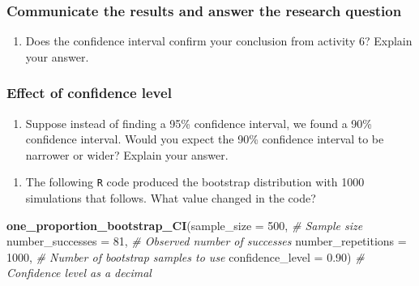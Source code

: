 \documentclass[
]{report}
\newenvironment{Shaded}{\begin{snugshade}}{\end{snugshade}}
\newcommand{\CommentTok}[1]{\textcolor[rgb]{0.56,0.35,0.01}{\textit{#1}}}
\newcommand{\DataTypeTok}[1]{\textcolor[rgb]{0.13,0.29,0.53}{#1}}
\newcommand{\DecValTok}[1]{\textcolor[rgb]{0.00,0.00,0.81}{#1}}
\newcommand{\FloatTok}[1]{\textcolor[rgb]{0.00,0.00,0.81}{#1}}
\newcommand{\KeywordTok}[1]{\textcolor[rgb]{0.13,0.29,0.53}{\textbf{#1}}}
\newcommand{\NormalTok}[1]{#1}
\providecommand{\tightlist}{%
  \setlength{\itemsep}{0pt}\setlength{\parskip}{0pt}}
\begin{document}
\vspace{.8in}

\hypertarget{communicate-the-results-and-answer-the-research-question-1}{%
\subsubsection*{Communicate the results and answer the research question}\label{communicate-the-results-and-answer-the-research-question-1}}

\begin{enumerate}
\def\labelenumi{\arabic{enumi}.}
\setcounter{enumi}{11}
\tightlist
\item
  Does the confidence interval confirm your conclusion from activity 6? Explain your answer.
\end{enumerate}

\vspace{1in}

\newpage

\hypertarget{effect-of-confidence-level}{%
\subsubsection{Effect of confidence level}\label{effect-of-confidence-level}}

\begin{enumerate}
\def\labelenumi{\arabic{enumi}.}
\setcounter{enumi}{12}
\tightlist
\item
  Suppose instead of finding a 95\% confidence interval, we found a 90\% confidence interval. Would you expect the 90\% confidence interval to be narrower or wider? Explain your answer.
\end{enumerate}

\vspace{0.5in}

\begin{enumerate}
\def\labelenumi{\arabic{enumi}.}
\setcounter{enumi}{13}
\tightlist
\item
  The following \texttt{R} code produced the bootstrap distribution with 1000 simulations that follows. What value changed in the code?
\end{enumerate}

\begin{Shaded}
\begin{Highlighting}[]
\KeywordTok{one\_proportion\_bootstrap\_CI}\NormalTok{(}\DataTypeTok{sample\_size =} \DecValTok{500}\NormalTok{, }\CommentTok{\# Sample size}
                    \DataTypeTok{number\_successes =} \DecValTok{81}\NormalTok{, }\CommentTok{\# Observed number of successes}
                    \DataTypeTok{number\_repetitions =} \DecValTok{1000}\NormalTok{, }\CommentTok{\# Number of bootstrap samples to use}
                    \DataTypeTok{confidence\_level =} \FloatTok{0.90}\NormalTok{) }\CommentTok{\# Confidence level as a decimal}
\end{Highlighting}
\end{Shaded}
\end{document}
